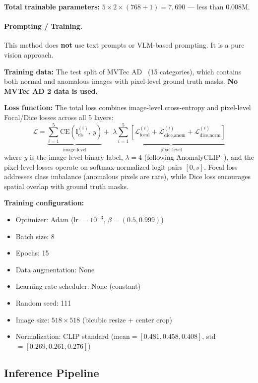 \documentclass[10pt,twocolumn,letterpaper]{article}
\begin{document}
\noindent\textbf{Total trainable parameters:} $5 \times 2 \times (768 + 1) = 7{,}690$ --- less than 0.008M.

\paragraph{Prompting / Training.}
This method does \textbf{not} use text prompts or VLM-based prompting. It is a pure vision approach.

\textbf{Training data:} The test split of MVTec AD~\cite{mvtecad} (15 categories), which contains both normal and anomalous images with pixel-level ground truth masks. \textbf{No MVTec AD 2 data is used.}

\textbf{Loss function:} The total loss combines image-level cross-entropy and pixel-level Focal/Dice losses across all 5 layers:
\begin{equation}
  \mathcal{L} = \underbrace{\sum_{i=1}^{5} \text{CE}\!\left(\mathbf{l}_{\text{cls}}^{(i)},\, y\right)}_{\text{image-level}} + \;\lambda \underbrace{\sum_{i=1}^{5} \left[\mathcal{L}_{\text{focal}}^{(i)} + \mathcal{L}_{\text{dice,anom}}^{(i)} + \mathcal{L}_{\text{dice,norm}}^{(i)}\right]}_{\text{pixel-level}}
\end{equation}
where $y$ is the image-level binary label, $\lambda = 4$ (following AnomalyCLIP~\cite{anomalyclip}), and the pixel-level losses operate on softmax-normalized logit pairs $[0, s]$. Focal loss~\cite{focalloss} addresses class imbalance (anomalous pixels are rare), while Dice loss encourages spatial overlap with ground truth masks.

\textbf{Training configuration:}
\begin{itemize}[nosep]
  \item Optimizer: Adam (lr $= 10^{-3}$, $\beta = (0.5, 0.999)$)
  \item Batch size: 8
  \item Epochs: 15
  \item Data augmentation: None
  \item Learning rate scheduler: None (constant)
  \item Random seed: 111
  \item Image size: $518 \times 518$ (bicubic resize + center crop)
  \item Normalization: CLIP standard (mean$=[0.481, 0.458, 0.408]$, std$=[0.269, 0.261, 0.276]$)
\end{itemize}

\subsection{Inference Pipeline}
\end{document}
